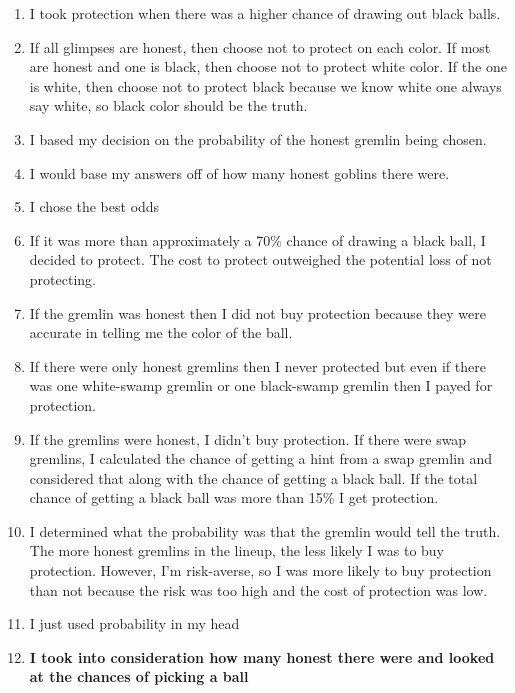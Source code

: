 \documentclass[12pt,a4paper]{article}
\begin{document}
\begin{enumerate}
\item I took protection when there was a higher chance of drawing out black balls.

\item If all glimpses are honest, then choose not to protect on each color. If most are honest and one is black, then choose not to protect white color. If the one is white, then choose not to protect black because we know white one always say white, so black color should be the truth.

\item I based my decision on the probability of the honest gremlin being chosen.

\item I would base my answers off of how many honest goblins there were.

\item I chose the best odds

\item If it was more than approximately a 70\% chance of drawing a black ball, I decided to protect. The cost to protect outweighed the potential loss of not protecting.

\item If the gremlin was honest then I did not buy protection because they were accurate in telling me the color of the ball.

\item If there were only honest gremlins then I never protected but even if there was one white-swamp gremlin or one black-swamp gremlin then I payed for protection.

\item If the gremlins were honest, I didn't buy protection. If there were swap gremlins, I calculated the chance of getting a hint from a swap gremlin and considered that along with the chance of getting a black ball. If the total chance of getting a black ball was more than 15\% I get protection.

\item I determined what the probability was that the gremlin would tell the truth. The more honest gremlins in the lineup, the less likely I was to buy protection. However, I'm risk-averse, so I was more likely to buy protection than not because the risk was too high and the cost of protection was low.

\item I just used probability in my head

\item \textbf{I took into consideration how many honest there were and looked at the chances of picking a ball}


\end{enumerate}
\end{document}
